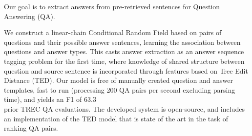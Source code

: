 Our goal is to extract answers from pre-retrieved sentences for Question Answering (QA).                                               
      
 
   We
 construct a
 linear-chain
 Conditional Random Field based on pairs of questions and
 their possible answer sentences, learning the association
 between questions and answer types.  This casts answer
 extraction as an answer sequence tagging problem for the first time, where
 knowledge of shared
 structure between question and source sentence is incorporated through
 features based on Tree Edit Distance (TED).
 Our model is free of manually created question and answer templates,
 fast to run (processing 200 QA pairs per second excluding parsing
 time), and yields an F1 of 63.3\\%
 prior TREC QA evaluations.  The developed system is open-source, and
 includes an implementation of the TED model that is state of the art
 in the task of ranking QA pairs.

